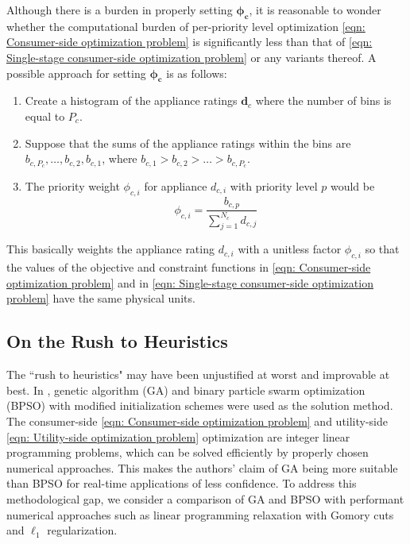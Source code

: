 \documentclass[journal, a4paper]{IEEEtran}
\begin{document}
Although there is a burden in properly setting $\bm{\phi_{c}}$,
it is reasonable to wonder whether the computational burden of per-priority level optimization
\eqref{eqn: Consumer-side optimization problem}
is significantly less than that of \eqref{eqn: Single-stage consumer-side optimization problem} or any variants thereof.
A possible approach for setting $\bm{\phi_{c}}$ is as follows:
\begin{enumerate}
	\item Create a histogram of the appliance ratings $\mathbf{d}_{c}$ where the number of bins is equal to $P_c$.
	\item Suppose that the sums of the appliance ratings within the bins are $b_{c,P_{c}}, \ldots, b_{c,2}, b_{c,1}$,
	where $b_{c,1} > b_{c,2} > \ldots > b_{c,P_{c}}$.
	\item The priority weight $\phi_{c,i}$ for appliance $d_{c,i}$ with priority level $p$ would be
	\begin{equation*}
		\phi_{c,i} = \frac{b_{c,p}}{\sum_{j=1}^{N_c} d_{c,j}}
	\end{equation*}
\end{enumerate}
This basically weights the appliance rating $d_{c,i}$ with a unitless factor $\phi_{c,i}$
so that the values of the objective and constraint functions
in \eqref{eqn: Consumer-side optimization problem}
and in \eqref{eqn: Single-stage consumer-side optimization problem}
have the same physical units.

\subsection{On the Rush to Heuristics}
\label{subsec: II. On the Rush to Heuristics}

The ``rush to heuristics" may have been unjustified at worst and improvable at best.
In \cite{Jabian2020}, genetic algorithm (GA) and binary particle swarm optimization (BPSO)
with modified initialization schemes were used as the solution method.
The consumer-side \eqref{eqn: Consumer-side optimization problem}
and utility-side \eqref{eqn: Utility-side optimization problem}
optimization are integer linear programming problems,
which can be solved efficiently by properly chosen numerical approaches.
This makes the authors' claim of GA being more suitable than BPSO for real-time applications
of less confidence.
To address this methodological gap, we consider a comparison of GA and BPSO
with performant numerical approaches such as linear programming relaxation with Gomory cuts
and $\ell_{1}$ regularization.
\end{document}

